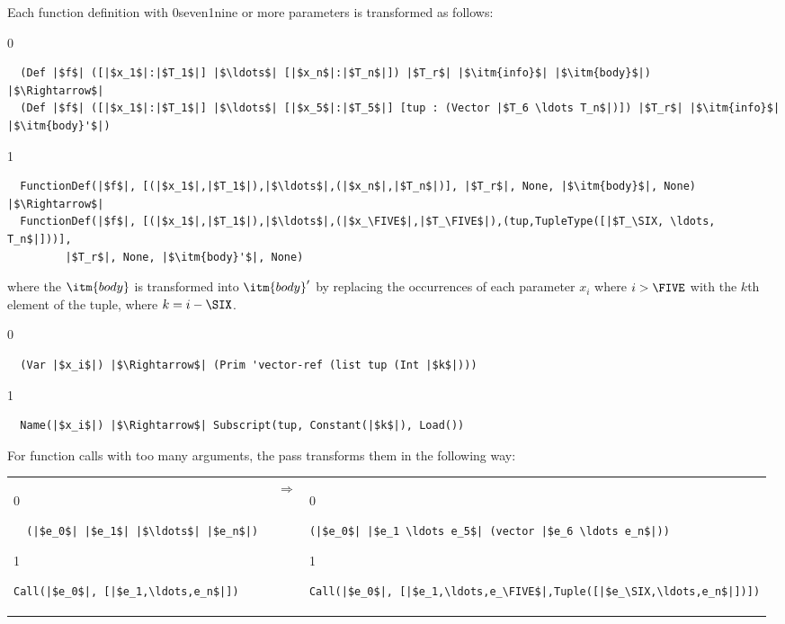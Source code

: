 \documentclass[7x10]{TimesAPriori_MIT}%
\def\racketEd{0}
\def\pythonEd{1}
\def\edition{1}
\def\xeightysixEd{0}
\def\riscvEd{1}
\def\architecture{1}
\newcommand\ifriscv[1]{\if\architecture\riscvEd{#1}\fi}
\newcommand\ifxeightsix[1]{\if\architecture\xeightysixEd{#1}\fi}
\newcommand{\pythonColor}[0]{}
\numberwithin{theorem}{chapter}
\numberwithin{definition}{chapter}
\numberwithin{equation}{chapter}
\begin{document}
Each function definition with \ifxeightsix{seven}\ifriscv{nine} or more parameters is transformed as
follows:
{\if\edition\racketEd   
\begin{lstlisting}
  (Def |$f$| ([|$x_1$|:|$T_1$|] |$\ldots$| [|$x_n$|:|$T_n$|]) |$T_r$| |$\itm{info}$| |$\itm{body}$|) 
|$\Rightarrow$|
  (Def |$f$| ([|$x_1$|:|$T_1$|] |$\ldots$| [|$x_5$|:|$T_5$|] [tup : (Vector |$T_6 \ldots T_n$|)]) |$T_r$| |$\itm{info}$| |$\itm{body}'$|) 
\end{lstlisting}
\fi}
{\if\edition\pythonEd\pythonColor   
\begin{lstlisting}
  FunctionDef(|$f$|, [(|$x_1$|,|$T_1$|),|$\ldots$|,(|$x_n$|,|$T_n$|)], |$T_r$|, None, |$\itm{body}$|, None)
|$\Rightarrow$|
  FunctionDef(|$f$|, [(|$x_1$|,|$T_1$|),|$\ldots$|,(|$x_\FIVE$|,|$T_\FIVE$|),(tup,TupleType([|$T_\SIX, \ldots, T_n$|]))],
         |$T_r$|, None, |$\itm{body}'$|, None)
\end{lstlisting}
\fi}
%
\noindent where the $\itm{body}$ is transformed into $\itm{body}'$ by
replacing the occurrences of each parameter $x_i$ where $i > \FIVE$ with
the $k$th element of the tuple, where $k = i - \SIX$.
%
{\if\edition\racketEd
\begin{lstlisting}
  (Var |$x_i$|) |$\Rightarrow$| (Prim 'vector-ref (list tup (Int |$k$|)))
\end{lstlisting}
\fi}
{\if\edition\pythonEd\pythonColor   
\begin{lstlisting}
  Name(|$x_i$|) |$\Rightarrow$| Subscript(tup, Constant(|$k$|), Load())
\end{lstlisting}
\fi}

For function calls with too many arguments, the 
pass transforms them in the following way:

\begin{tabular}{lll}
\begin{minipage}{0.3\textwidth}
{\if\edition\racketEd
\begin{lstlisting}
  (|$e_0$| |$e_1$| |$\ldots$| |$e_n$|) 
\end{lstlisting}
\fi}
{\if\edition\pythonEd\pythonColor
\begin{lstlisting}
Call(|$e_0$|, [|$e_1,\ldots,e_n$|])
\end{lstlisting}
\fi}
\end{minipage}
&
$\Rightarrow$
&
\begin{minipage}{0.5\textwidth}
{\if\edition\racketEd
\begin{lstlisting}
(|$e_0$| |$e_1 \ldots e_5$| (vector |$e_6 \ldots e_n$|))
\end{lstlisting}
\fi}
{\if\edition\pythonEd\pythonColor
\begin{lstlisting}
Call(|$e_0$|, [|$e_1,\ldots,e_\FIVE$|,Tuple([|$e_\SIX,\ldots,e_n$|])])
\end{lstlisting}
\fi}
\end{minipage}
\end{tabular}
\end{document}
